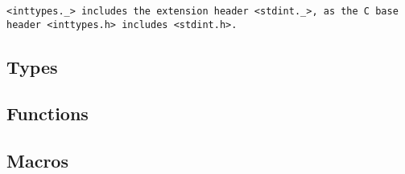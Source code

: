 \def\Subsection#1{\subsection{#1}}

\tt{<inttypes._>} includes the extension header \tt{<stdint._>},
as the C base header \tt{<inttypes.h>} includes \tt{<stdint.h>}.

\Subsection{Types}

\Subsection{Functions}

\Subsection{Macros}
